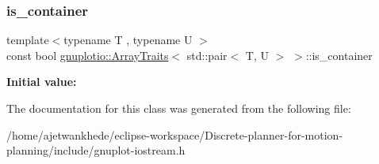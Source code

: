 \subsubsection{\texorpdfstring{is\+\_\+container}{is\_container}}
{\footnotesize\ttfamily template$<$typename T , typename U $>$ \\
const bool \mbox{\hyperlink{classgnuplotio_1_1ArrayTraits}{gnuplotio\+::\+Array\+Traits}}$<$ std\+::pair$<$ T, U $>$ $>$\+::is\+\_\+container\hspace{0.3cm}{\ttfamily [static]}}

{\bfseries Initial value\+:}
\begin{DoxyCode}{0}
\end{DoxyCode}


The documentation for this class was generated from the following file\+:\begin{DoxyCompactItemize}
\item 
/home/ajetwankhede/eclipse-\/workspace/\+Discrete-\/planner-\/for-\/motion-\/planning/include/gnuplot-\/iostream.\+h\end{DoxyCompactItemize}
